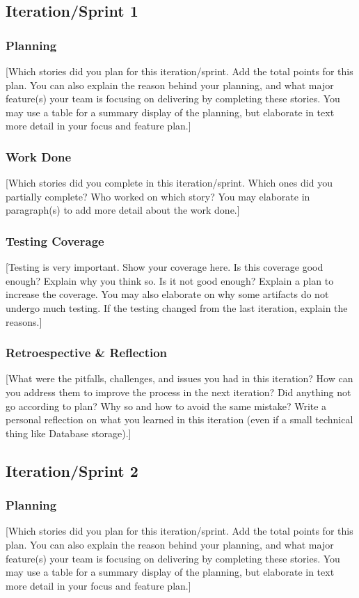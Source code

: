 \documentclass{article}
\begin{document}
\subsection{Iteration/Sprint 1}
\subsubsection{Planning}
[Which stories did you plan for this iteration/sprint. Add the total points for this plan. You can also explain the reason behind your planning, and what major feature(s) your team is focusing on delivering by completing these stories. You may use a table for a summary display of the planning, but elaborate in text more detail in your focus and feature plan.]

\subsubsection{Work Done}
[Which stories did you complete in this iteration/sprint. Which ones did you partially complete? Who worked on which story? You may elaborate in paragraph(s) to add more detail about the work done.]

\subsubsection{Testing Coverage}
[Testing is very important. Show your coverage here. Is this coverage good enough? Explain why you think so. Is it not good enough? Explain a plan to increase the coverage. You may also elaborate on why some artifacts do not undergo much testing. If the testing changed from the last iteration, explain the reasons.]

\subsubsection{Retroespective \& Reflection}
[What were the pitfalls, challenges, and issues you had in this iteration? How can you address them to improve the process in the next iteration? Did anything not go according to plan? Why so and how to avoid the same mistake? Write a personal reflection on what you learned in this iteration (even if a small technical thing like Database storage).]


\subsection{Iteration/Sprint 2}
\subsubsection{Planning}
[Which stories did you plan for this iteration/sprint. Add the total points for this plan. You can also explain the reason behind your planning, and what major feature(s) your team is focusing on delivering by completing these stories. You may use a table for a summary display of the planning, but elaborate in text more detail in your focus and feature plan.]
\end{document}
